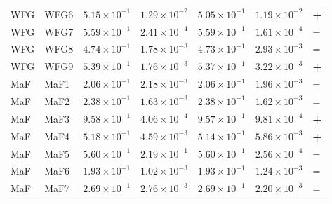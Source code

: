 \begin{table}[t]
\begin{tabular}{llrrrrl}
WFG & WFG6 & $5.15\!\times\!10^{-1}$ & $1.29\!\times\!10^{-2}$ & $5.05\!\times\!10^{-1}$ & $1.19\!\times\!10^{-2}$ & \textbf{+} \\
WFG & WFG7 & $5.59\!\times\!10^{-1}$ & $2.41\!\times\!10^{-4}$ & $5.59\!\times\!10^{-1}$ & $1.61\!\times\!10^{-4}$ & = \\
WFG & WFG8 & $4.74\!\times\!10^{-1}$ & $1.78\!\times\!10^{-3}$ & $4.73\!\times\!10^{-1}$ & $2.93\!\times\!10^{-3}$ & = \\
WFG & WFG9 & $5.39\!\times\!10^{-1}$ & $1.76\!\times\!10^{-3}$ & $5.37\!\times\!10^{-1}$ & $3.22\!\times\!10^{-3}$ & \textbf{+} \\
\addlinespace
MaF & MaF1 & $2.06\!\times\!10^{-1}$ & $2.18\!\times\!10^{-3}$ & $2.06\!\times\!10^{-1}$ & $1.96\!\times\!10^{-3}$ & = \\
MaF & MaF2 & $2.38\!\times\!10^{-1}$ & $1.63\!\times\!10^{-3}$ & $2.38\!\times\!10^{-1}$ & $1.62\!\times\!10^{-3}$ & = \\
MaF & MaF3 & $9.58\!\times\!10^{-1}$ & $4.06\!\times\!10^{-4}$ & $9.57\!\times\!10^{-1}$ & $9.81\!\times\!10^{-4}$ & \textbf{+} \\
MaF & MaF4 & $5.18\!\times\!10^{-1}$ & $4.59\!\times\!10^{-3}$ & $5.14\!\times\!10^{-1}$ & $5.86\!\times\!10^{-3}$ & \textbf{+} \\
MaF & MaF5 & $5.60\!\times\!10^{-1}$ & $2.19\!\times\!10^{-1}$ & $5.60\!\times\!10^{-1}$ & $2.56\!\times\!10^{-4}$ & = \\
MaF & MaF6 & $1.93\!\times\!10^{-1}$ & $1.02\!\times\!10^{-3}$ & $1.93\!\times\!10^{-1}$ & $1.24\!\times\!10^{-3}$ & = \\
MaF & MaF7 & $2.69\!\times\!10^{-1}$ & $2.76\!\times\!10^{-3}$ & $2.69\!\times\!10^{-1}$ & $2.20\!\times\!10^{-3}$ & = \\
\bottomrule
\end{tabular}
\end{table}

